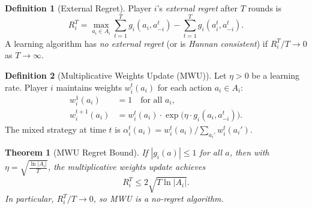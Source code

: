 \documentclass[11pt,a4paper]{article}
\theoremstyle{definition}
\newtheorem{definition}{Definition}[section]
\theoremstyle{plain}
\newtheorem{theorem}{Theorem}[section]
\theoremstyle{remark}
\begin{document}
\begin{definition}[External Regret]
\label{def:external-regret}
Player $i$'s \emph{external regret} after $T$ rounds is
\[
    R_i^T = \max_{a_i \in A_i} \sum_{t=1}^T g_i(a_i, a_{-i}^t)
    - \sum_{t=1}^T g_i(a_i^t, a_{-i}^t).
\]
A learning algorithm has \emph{no external regret} (or is \emph{Hannan consistent}) if
$R_i^T / T \to 0$ as $T \to \infty$.
\end{definition}

\begin{definition}[Multiplicative Weights Update (MWU)]
\label{def:mwu}
Let $\eta > 0$ be a learning rate. Player $i$ maintains weights $w_i^t(a_i)$ for each
action $a_i \in A_i$:
\begin{align*}
    w_i^1(a_i) &= 1 \quad \text{for all } a_i, \\
    w_i^{t+1}(a_i) &= w_i^t(a_i) \cdot \exp\bigl(\eta \cdot g_i(a_i, a_{-i}^t)\bigr).
\end{align*}
The mixed strategy at time $t$ is $\alpha_i^t(a_i) = w_i^t(a_i) / \sum_{a_i'} w_i^t(a_i')$.
\end{definition}

\begin{theorem}[MWU Regret Bound]
\label{thm:mwu-regret}
If $|g_i(a)| \leq 1$ for all $a$, then with $\eta = \sqrt{\frac{\ln |A_i|}{T}}$, the
multiplicative weights update achieves
\[
    R_i^T \leq 2\sqrt{T \ln |A_i|}.
\]
In particular, $R_i^T / T \to 0$, so MWU is a no-regret algorithm.
\end{theorem}
\end{document}
